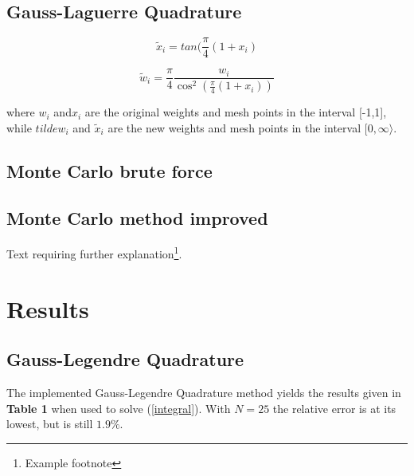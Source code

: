 \documentclass[twoside,twocolumn]{article}
\begin{document}
\subsection{Gauss-Laguerre Quadrature}

\begin{equation}
	\tilde{x}_i = tan(\frac{\pi}{4}(1+x_i)
\end{equation}

\begin{equation}
	\tilde{w}_i = \frac{\pi}{4}\frac{w_i}{\cos^2(\frac{\pi}{4}(1+x_i))}
\end{equation}

where $w_i$ and$x_i$ are the original weights and mesh points in the interval [-1,1], while $tilde{w}_i$ and $\tilde{x}_i$ are the new weights and mesh points in the interval $[0,\infty\rangle$.
\subsection{Monte Carlo brute force}
\subsection{Monte Carlo method improved}

Text requiring further explanation\footnote{Example footnote}.


\section{Results}


\subsection{Gauss-Legendre Quadrature}
The implemented Gauss-Legendre Quadrature method yields the results given in \textbf{Table 1} when used to solve (\ref{integral}). With $N=25$ the relative error is at its lowest, but is still $1.9 \%$.
\end{document}
